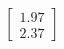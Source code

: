 \documentclass[preview]{standalone}
\begin{document}
\begin{align*}
\begin{bmatrix} 1.97 \\ 2.37 \end{bmatrix}
\end{align*}
\end{document}
